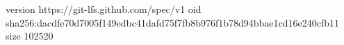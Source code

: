 version https://git-lfs.github.com/spec/v1
oid sha256:dacdfe70d7005f149edbc41dafd75f7fb8b976f1b78d94bbae1cd16e240cfb11
size 102520
